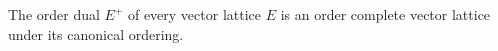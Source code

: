 The order dual $E^+$ of every vector lattice $E$ is an order complete vector lattice under its canonical ordering.
